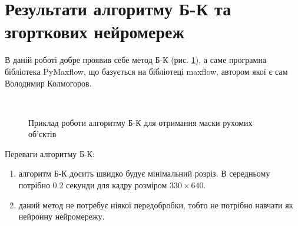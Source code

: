 \section{Результати алгоритму Б-К та згорткових нейромереж}

В даній роботі добре проявив себе метод Б-К (рис. \ref{fig:bk_examples}),
а саме програмна бібліотека PyMaxflow,
що базується на бібліотеці maxflow, автором якої є сам Володимир Колмогоров.

\begin{figure}[H]
    \centering

    \\
    \caption{Приклад роботи алгоритму Б-К для отримання маски рухомих об'єктів
        \label{fig:bk_examples}
    }
\end{figure}

Переваги алгоритму Б-К:
\begin{enumerate}
    \item алгоритм Б-К досить швидко будує мінімальний розріз. В середньому
          потрібно 0.2 секунди для кадру розміром $330 \times 640$.
    \item даний метод не потребує ніякої передобробки, тобто не потрібно навчати
          як нейронну нейромережу.
\end{enumerate}

